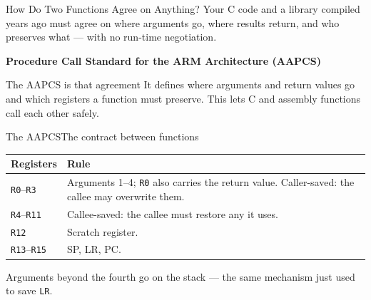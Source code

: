 \documentclass[9pt,aspectratio=169,xcolor=table]{beamer}
\begin{document}
\begin{frame}{How Do Two Functions Agree on Anything?}
    \leavevmode
{\small
	Your C code and a library compiled years ago must agree on where
	arguments go, where results return, and who preserves what ---
	with no run-time negotiation.}

    \vspace{3mm}
    \begin{center}
    \end{center}

\vspace{2mm} \textbf{\small Procedure Call Standard for the ARM Architecture (AAPCS)} \vspace{1mm} \begin{block}{The AAPCS is that agreement} It defines where arguments and return values go and which registers a function must preserve. This lets C and assembly functions call each other safely. \end{block}
\end{frame}

\begin{frame}{The AAPCS}{The contract between functions}
    \begin{center}
    {\small
    \striped
    \begin{tabular}{@{}l R{.62\textwidth}@{}}
\toprule
\textbf{Registers} & \textbf{Rule} \\
\midrule
\texttt{R0}--\texttt{R3}
& Arguments 1--4; \texttt{R0} also carries the return value. \alert{Caller-saved}: the callee may overwrite them. \\[1mm]
\texttt{R4}--\texttt{R11}
& \phantom{}\alert{Callee-saved}: the callee must restore any it uses. \\
\texttt{R12}
& Scratch register. \\
\texttt{R13}--\texttt{R15}
& SP, LR, PC. \\
\bottomrule
    \end{tabular}}
    \end{center}

    \vspace{3mm}
    {\small Arguments beyond the fourth go on the \alert{stack} ---
    the same mechanism just used to save \texttt{LR}.}
\end{frame}
\end{document}
